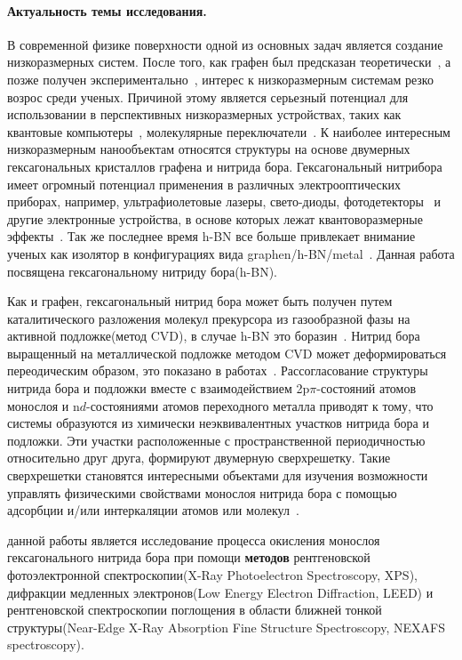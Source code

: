 
{\actuality} 
\paragraph{Актуальность темы исследования.}
В современной физике поверхности одной из основных задач является
создание низкоразмерных систем. После того, как графен был предсказан
теоретически~\cite{Wallace1947,McClure1956,Slonczewski1958}, а позже получен экспериментально~\cite{Novoselov2004}, интерес к 
низкоразмерным системам резко возрос среди ученых. Причиной этому является
серьезный потенциал для использовании в перспективных низкоразмерных 
устройствах, таких как квантовые компьютеры~\cite{Barends2014}, молекулярные переключатели~\cite{G.Joachim2000,Nitzan2003}. 
К наиболее интересным низкоразмерным нанообъектам относятся структуры на 
основе двумерных гексагональных кристаллов графена и нитрида бора.
Гексагональный нитрибора имеет огромный потенциал применения в различных
электрооптических приборах, например, ультрафиолетовые лазеры, 
свето-диоды, фотодетекторы~\cite{Zheng2008} и другие электронные
устройства, в основе которых лежат квантоворазмерные эффекты~\cite{
Chau2007}. Так же последнее время h-BN все больше привлекает внимание
ученых как изолятор в конфигурациях вида graphen/h-BN/metal~\cite{
Kamalakar2014,Kamalakar2016,Usachev_doc}.
Данная работа посвящена гексагональному нитриду бора(h-BN). 


Как и графен, гексагональный нитрид бора может быть получен путем каталитического разложения молекул прекурсора из газообразной 
фазы на активной подложке(метод CVD), в случае h-BN это
боразин~\cite{Kidambi2014,Paffett1990}. Нитрид бора выращенный на
металлической подложке методом CVD может деформироваться
переодическим образом, это показано в работах~\cite{Preobrajenski2008_Adsorption-inducedgapstatesofh-BNonmetalsurfaces,Brugger2009,Nagashima1995,Weng2016}. Рассогласование структуры нитрида
бора и подложки вместе с взаимодействием 2p$\pi$-состояний атомов монослоя
и n$d$-состояниями атомов переходного металла приводят к тому, что 
системы образуются из химически неэквивалентных участков нитрида бора и подложки.
Эти участки расположенные с пространственной периодичностью 
относительно друг друга, формируют двумерную сверхрешетку. Такие
сверхрешетки становятся интересными объектами для изучения возможности
управлять физическими свойствами монослоя нитрида бора с помощью
адсорбции и/или интеркаляции атомов или молекул~\cite{Ataca2010}.


{\aim} данной работы является исследование процесса окисления 
монослоя гексагонального нитрида бора при помощи \textbf{методов} 
рентгеновской фотоэлектронной спектроскопии(X-Ray Photoelectron 
Spectroscopy, XPS), дифракции медленных электронов(Low Energy 
Electron Diffraction, LEED) и рентгеновской спектроскопии
поглощения в области ближней тонкой структуры(Near-Edge 
X-Ray Absorption Fine Structure Spectroscopy, NEXAFS
spectroscopy). 

